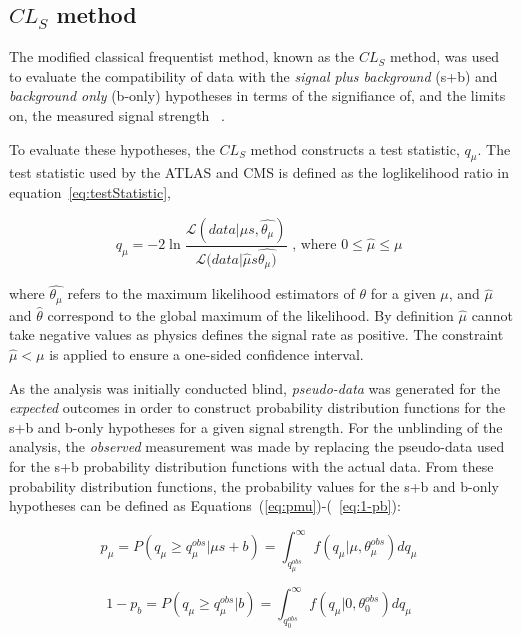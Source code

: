 \subsection{$CL_{S}$ method}\label{subsec:CLsMethod}
The modified classical frequentist method, known as the $CL_{S}$ method, was used to evaluate the compatibility of data with the \emph{signal plus background} (s+b) and \emph{background only} (b-only) hypotheses in terms of the signifiance of, and the limits on, the measured signal strength ~\cite{AsymptoticFormulae}.

To evaluate these hypotheses, the $CL_{S}$ method constructs a test statistic, $q_{\mu}$.
The test statistic used by the ATLAS and CMS is defined as the loglikelihood ratio in equation~\ref{eq:testStatistic},

\begin{equation}
q_{\mu} =  -2 \ln \frac{ \mathcal{L}(data | \mu s , \hat{\theta_{\mu}})} { \mathcal{L}(data | \hat{\mu} s \hat{\theta_{\mu})  }} \textrm{ , where } 0 \leq \hat{\mu} \leq \mu \;
\label{eq:testStatistic}
\end{equation}

where $\hat{\theta_{\mu}}$ refers to the maximum likelihood estimators of $\theta$ for a given $\mu$, and 
$\hat{\mu}$ and $\hat{\theta}$ correspond to the global maximum of the likelihood. 
By definition $\hat{\mu}$ cannot take negative values as physics defines the signal rate as positive. 
The constraint $\hat{\mu} < \mu$ is applied to ensure a one-sided confidence interval.

As the analysis was initially conducted blind, \emph{pseudo-data} was generated for the \emph{expected} outcomes in order to construct probability distribution functions for the s+b and b-only hypotheses for a given signal strength.
For the unblinding of the analysis, the \emph{observed} measurement was made by replacing the pseudo-data used for the s+b probability distribution functions with the actual data.
From these probability distribution functions, the probability values for the s+b and b-only hypotheses can be defined as Equations~(\ref{eq:pmu})-(~\ref{eq:1-pb}):

\begin{equation}
p_{\mu} = P ( q_{\mu} \geq  q_{\mu}^{obs} | \mu s + b ) = \int^{\infty}_{q_{\mu}^{obs}} f ( q_{\mu} | \mu , \theta_{\mu}^{obs} ) dq_{\mu} \;
\label{eq:pmu}
\end{equation}

\begin{equation}
1 - p_{b} = P ( q_{\mu} \geq  q_{\mu}^{obs} | b ) = \int^{\infty}_{q_{0}^{obs}} f ( q_{\mu} | 0 , \theta_{0}^{obs} ) dq_{\mu} \;
\label{eq:1-pb}
\end{equation}

